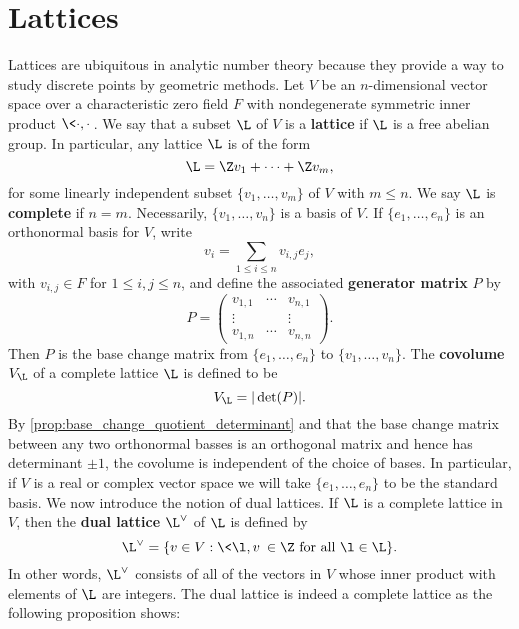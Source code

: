   \section{Lattices}
    Lattices are ubiquitous in analytic number theory because they provide a way to study discrete points by geometric methods. Let $V$ be an $n$-dimensional vector space over a characteristic zero field $F$ with nondegenerate symmetric inner product $\<\cdot,\cdot\>$. We say that a subset $\L$ of $V$ is a \textbf{lattice} if $\L$ is a free abelian group. In particular, any lattice $\L$ is of the form
    \[
      \L = \Z v_{1}+\cdots+\Z v_{m},
    \]
    for some linearly independent subset $\{v_{1},\ldots,v_{m}\}$ of $V$ with $m \le n$. We say $\L$ is \textbf{complete} if $n = m$. Necessarily, $\{v_{1},\ldots,v_{n}\}$ is a basis of $V$. If $\{e_{1},\ldots,e_{n}\}$ is an orthonormal basis for $V$, write
    \[
      v_{i} = \sum_{1 \le i \le n}v_{i,j}e_{j},
    \]
    with $v_{i,j} \in F$ for $1 \le i,j \le n$, and define the associated \textbf{generator matrix} $P$ by
    \[
      P = \begin{pmatrix} v_{1,1} & \cdots & v_{n,1} \\ \vdots & & \vdots \\ v_{1,n} & \cdots & v_{n,n} \end{pmatrix}.
    \]
    Then $P$ is the base change matrix from $\{e_{1},\ldots,e_{n}\}$ to $\{v_{1},\ldots,v_{n}\}$. The \textbf{covolume} $V_{\L}$ of a complete lattice $\L$ is defined to be
    \[
      V_{\L} = |\det(P)|.
    \]
    By \cref{prop:base_change_quotient_determinant} and that the base change matrix between any two orthonormal basses is an orthogonal matrix and hence has determinant $\pm 1$, the covolume is independent of the choice of bases. In particular, if $V$ is a real or complex vector space we will take $\{e_{1},\ldots,e_{n}\}$ to be the standard basis. We now introduce the notion of dual lattices. If $\L$ is a complete lattice in $V$, then the \textbf{dual lattice} $\L^{\vee}$ of $\L$ is defined by
    \[
      \L^{\vee} = \{v \in V:\text{$\<\l,v\> \in \Z$ for all $\l \in \L$}\}.
    \]
    In other words, $\L^{\vee}$ consists of all of the vectors in $V$ whose inner product with elements of $\L$ are integers. The dual lattice is indeed a complete lattice as the following proposition shows:

